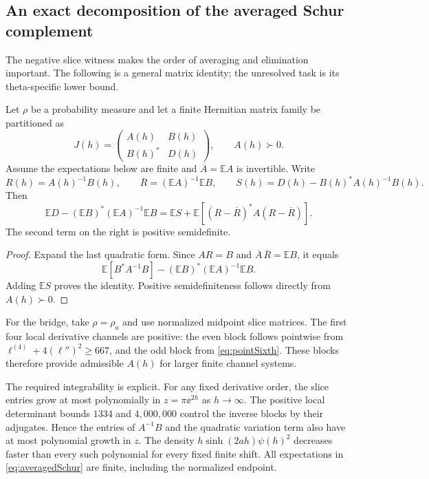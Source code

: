 \subsection{An exact decomposition of the averaged Schur complement}
The negative slice witness makes the order of averaging and elimination important. The following is a general matrix identity; the unresolved task is its theta-specific lower bound.

\begin{proposition}\label{prop:averagedSchur}
Let $\rho$ be a probability measure and let a finite Hermitian matrix family be partitioned as
\[
J(h)=\begin{pmatrix}A(h)&B(h)\\B(h)^*&D(h)\end{pmatrix},
\qquad A(h)\succ0.
\]
Assume the expectations below are finite and $\overline A=\mathbb EA$ is invertible. Write
\[
R(h)=A(h)^{-1}B(h),\qquad
\overline R=(\mathbb EA)^{-1}\mathbb EB,
\qquad S(h)=D(h)-B(h)^*A(h)^{-1}B(h).
\]
Then
\begin{equation}\label{eq:averagedSchur}
\boxed{
\mathbb ED-(\mathbb EB)^*(\mathbb EA)^{-1}\mathbb EB
=\mathbb ES+
\mathbb E\left[(R-\overline R)^*A(R-\overline R)\right].
}
\end{equation}
The second term on the right is positive semidefinite.
\end{proposition}
\begin{proof}
Expand the last quadratic form. Since $AR=B$ and
$\overline A\,\overline R=\mathbb EB$, it equals
\[
\mathbb E[B^*A^{-1}B]
-(\mathbb EB)^*(\mathbb EA)^{-1}\mathbb EB.
\]
Adding $\mathbb ES$ proves the identity. Positive semidefiniteness follows directly from $A(h)\succ0$.
\end{proof}

For the bridge, take $\rho=\rho_a$ and use normalized midpoint slice matrices. The first four local derivative channels are positive: the even block follows pointwise from $\ell^{(4)}+4(\ell'')^2\ge667$, and the odd block from \eqref{eq:pointSixth}. These blocks therefore provide admissible $A(h)$ for larger finite channel systems.

The required integrability is explicit. For any fixed derivative order, the slice entries grow at most polynomially in $z=\pi\ee^{2h}$ as $h\to\infty$. The positive local determinant bounds $1334$ and $4{,}000{,}000$ control the inverse blocks by their adjugates. Hence the entries of $A^{-1}B$ and the quadratic variation term also have at most polynomial growth in $z$. The density $h\sinh(2ah)\psi(h)^2$ decreases faster than every such polynomial for every fixed finite shift. All expectations in \eqref{eq:averagedSchur} are finite, including the normalized endpoint.

